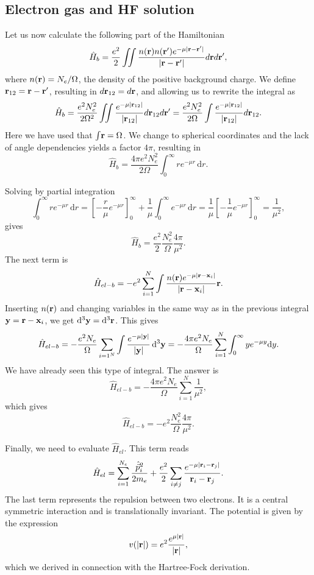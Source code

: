 \documentclass[%
twoside,                 %
final,                   %
10pt]{article}
\begin{document}
\subsection{Electron gas and HF solution}
\begin{block}{}
Let us now calculate the following part of the Hamiltonian
\[ \hat H_b = \frac{e^2}{2} \iint \frac{n({\bf r}) n({\bf r}')e^{-\mu|{\bf r} - {\bf r}'|}}{|{\bf r} - {\bf r}'|} d{\bf r} d{\bf r}' , 
\]
where $n({\bf r}) = N_e/\Omega$, the density of the positive background charge. We define ${\bf r}_{12} = {\bf r} - {\bf r}'$, resulting in $d{\bf r}_{12} = d{\bf r}$, and allowing us to rewrite the integral as
\[ 
\hat H_b = \frac{e^2 N_e^2}{2\Omega^2} \iint \frac{e^{-\mu |{\bf r}_{12}|}}{|{\bf r}_{12}|} d{\bf r}_{12} d{\bf r}' = \frac{e^2 N_e^2}{2\Omega} \int \frac{e^{-\mu |{\bf r}_{12}|}}{|{\bf r}_{12}|} d{\bf r}_{12} . 
\]
Here we have used that $\int \! {\bf r} = \Omega$. We change to spherical coordinates and the lack of angle 
dependencies yields a factor $4\pi$, resulting in
\[ 
\hat H_b = \frac{4\pi e^2 N_e^2}{2\Omega} \int_0^\infty re^{-\mu r} \, \mathrm{d} r . 
\]


Solving by partial integration
\[ \int_0^\infty re^{-\mu r} \, \mathrm{d} r = \left[ -\frac{r}{\mu} e^{-\mu r} \right]_0^\infty + \frac{1}{\mu} \int_0^\infty e^{-\mu r} \, \mathrm{d} r
= \frac{1}{\mu} \left[ - \frac{1}{\mu} e^{-\mu r} \right]_0^\infty = \frac{1}{\mu^2}, 
\]
gives
\[
\hat{H}_b = \frac{e^2}{2} \frac{N_e^2}{\Omega} \frac{4\pi}{\mu^2} .
\]
The next term is 
\[ 
\hat H_{el-b} = -e^2 \sum_{i = 1}^N \int \frac{n({\bf r}) e^{-\mu |{\bf r} - {\bf x}_i|}}{|{\bf r} - {\bf x}_i|} {\bf r} . 
\]
Inserting  $n({\bf r})$ and changing variables in the same way as in the previous integral ${\bf y} = {\bf r} - {\bf x}_i$, we get $\mathrm{d}^3 {\bf y} = \mathrm{d}^3 {\bf r}$. This gives
\[ 
\hat H_{el-b} = -\frac{e^2 N_e}{\Omega} \sum_{i = 1^N} \int \frac{e^{-\mu |{\bf y}|}}{|{\bf y}|} \, \mathrm{d}^3 {\bf y}
=  -\frac{4\pi e^2 N_e}{\Omega} \sum_{i = 1}^N \int_0^\infty y e^{-\mu y} \mathrm{d} y. 
\]
We have already seen this  type of integral. The answer is 
\[ 
\hat H_{el-b} = -\frac{4\pi e^2 N_e}{\Omega} \sum_{i = 1}^N \frac{1}{\mu^2}, 
\]
which gives
\[
\hat H_{el-b} = -e^2 \frac{N_e^2}{\Omega} \frac{4\pi}{\mu^2} .
\]

Finally, we need to evaluate $\hat H_{el}$. This term reads
\[ 
\hat H_{el} = \sum_{i=1}^{N_e} \frac{\hat{\vec p}_i^2}{2m_e} + \frac{e^2}{2} \sum_{i \neq j} \frac{e^{-\mu |{\bf r}_i - {\bf r}_j|}}{{\bf r}_i - {\bf r}_j} . 
\]
The last term represents the repulsion between two electrons. It is a central symmetric interaction
and is translationally invariant. The potential is given by the expression
\[ 
v(|{\bf r}|) = e^2 \frac{e^{\mu|{\bf r}|}}{|{\bf r}|}, 
\]
which we derived in connection with the Hartree-Fock derivation.


\end{block}






\printindex
\end{document}

